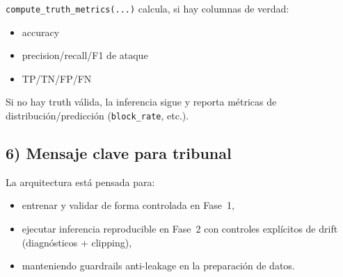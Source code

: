 ﻿\documentclass[12pt,a4paper]{article}
\begin{document}
\verb|compute_truth_metrics(...)| calcula, si hay columnas de verdad:

\begin{itemize}
  \item accuracy
  \item precision/recall/F1 de ataque
  \item TP/TN/FP/FN
\end{itemize}

Si no hay truth válida, la inferencia sigue y reporta métricas de distribución/predicción
(\texttt{block\_rate}, etc.).

\subsection{6) Mensaje clave para tribunal}

La arquitectura está pensada para:

\begin{itemize}
  \item entrenar y validar de forma controlada en Fase~1,
  \item ejecutar inferencia reproducible en Fase~2 con controles explícitos de drift (diagnósticos
        + clipping),
  \item manteniendo guardrails anti-leakage en la preparación de datos.
\end{itemize}
\end{document}
